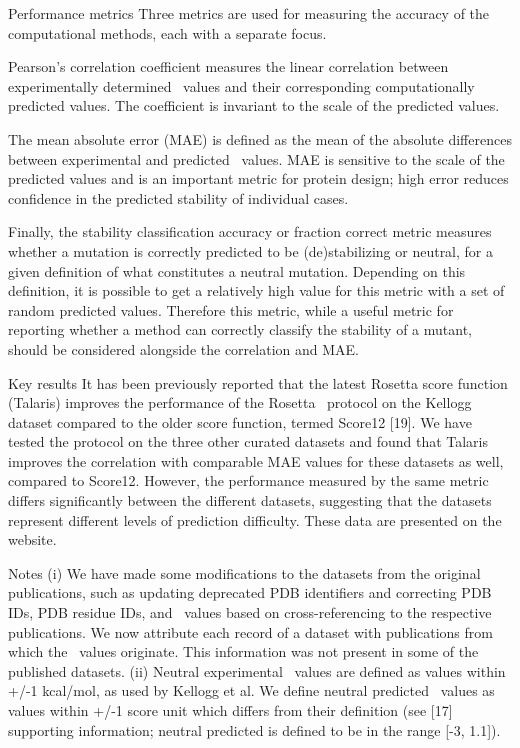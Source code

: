 Performance metrics
Three metrics are used for measuring the accuracy of the computational methods, each with a separate focus.

Pearson's correlation coefficient measures the linear correlation between experimentally determined \ddg\ values and their corresponding computationally predicted values. The coefficient is invariant to the scale of the predicted values.

The mean absolute error (MAE) is defined as the mean of the absolute differences between experimental and predicted \ddg\ values. MAE is sensitive to the scale of the predicted values and is an important metric for protein design; high error reduces confidence in the predicted stability of individual cases.

Finally, the stability classification accuracy or fraction correct metric measures whether a mutation is correctly predicted to be (de)stabilizing or neutral, for a given definition of what constitutes a neutral mutation. Depending on this definition, it is possible to get a relatively high value for this metric with a set of random predicted values. Therefore this metric, while a useful metric for reporting whether a method can correctly classify the stability of a mutant, should be considered alongside the correlation and MAE.

Key results
It has been previously reported that the latest Rosetta score function (Talaris) improves the performance of the Rosetta \ddg\ protocol on the Kellogg dataset compared to the older score function, termed Score12 [19]. We have tested the protocol on the three other curated datasets and found that Talaris improves the correlation with comparable MAE values for these datasets as well, compared to Score12. However, the performance measured by the same metric differs significantly between the different datasets, suggesting that the datasets represent different levels of prediction difficulty. These data are presented on the website.

Notes
(i) We have made some modifications to the datasets from the original publications, such as updating deprecated PDB identifiers and correcting PDB IDs, PDB residue IDs, and \ddg\ values based on cross-referencing to the respective publications. We now attribute each record of a dataset with publications from which the \ddg\ values originate. This information was not present in some of the published datasets. (ii) Neutral experimental \ddg\ values are defined as values within +/-1 kcal/mol, as used by Kellogg et al. We define neutral predicted \ddg\ values as values within +/-1 score unit which differs from their definition (see [17] supporting information; neutral predicted is defined to be in the range [-3, 1.1]).

